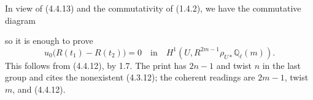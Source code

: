 In view of (4.4.13) and the commutativity of (1.4.2), we have the
commutative diagram
\begin{center}
\end{center}
so it is enough to prove
\begin{equation*}
u_0\bigl(R(t_1)-R(t_2)\bigr)=0
\quad\text{in}\quad
H^1(U,R^{2m-1}\rho_{U*}\mathbb Q_\ell(m)).
\end{equation*}
This follows from (4.4.12), by 1.7.  The print has $2n-1$ and twist
$n$ in the last group and cites the nonexistent (4.3.12); the coherent
readings are $2m-1$, twist $m$, and (4.4.12).

